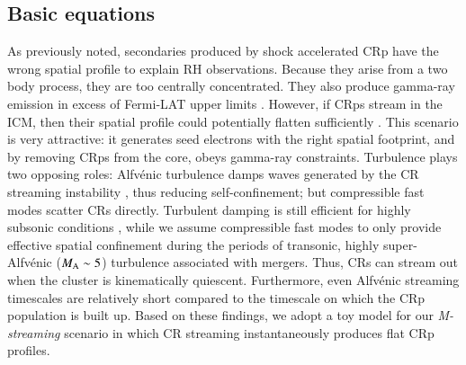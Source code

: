 \documentclass[fleqn,usenatbib,useAMS]{mnras}
\newcommand{\Mstream}{{\it M-streaming}\xspace}
\begin{document}
\subsection{Basic equations}
As previously noted, secondaries produced by shock accelerated CRp
have the wrong spatial profile to explain RH observations. Because
they arise from a two body process, they are too centrally
concentrated. They also produce gamma-ray emission in excess of
Fermi-LAT upper limits
\citep{2012ApJ...757..123A,brunetti12,2014ApJ...787...18A}. However,
if CRps stream in the ICM, then their spatial profile could
potentially flatten sufficiently \citep{ensslin11,wiener13}. This
scenario is very attractive: it generates seed electrons with the
right spatial footprint, and by removing CRps from the core, obeys
gamma-ray constraints. Turbulence plays two opposing roles:
Alfv{\'e}nic turbulence damps waves generated by the CR streaming
instability \citep{yan02,farmer04}, thus reducing self-confinement;
but compressible fast modes scatter CRs directly. Turbulent damping is
still efficient for highly subsonic conditions \citep{wiener13}, while
we assume compressible fast modes to only provide effective spatial
confinement during the periods of transonic, highly super-Alfv{\'e}nic
($M_{\rm A} \sim 5$) turbulence associated with mergers. Thus, CRs can
stream out when the cluster is kinematically quiescent. Furthermore,
even Alfv{\'e}nic streaming timescales are relatively short
\cite[$\sim 0.1-0.5$ Gyr;][]{wiener13} compared to the timescale on
which the CRp population is built up. Based on these findings, we
adopt a toy model for our \Mstream scenario in which CR streaming
instantaneously produces flat CRp profiles.
\end{document}
